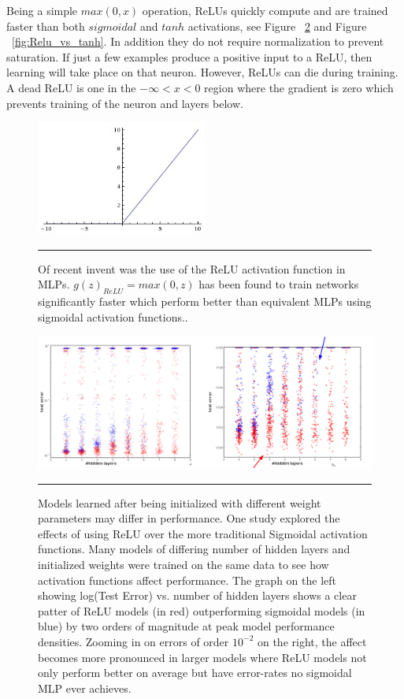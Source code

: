 Being a simple $max(0,x)$ operation, ReLUs quickly compute and are trained faster than both $sigmoidal$ and $tanh$ activations, see Figure ~\ref{fig:Relu_vs_sigmoidal} and Figure ~\ref{fig:Relu_vs_tanh}\citep{krizhevsky2012imagenet}.
In addition they do not require normalization to prevent saturation\citep{krizhevsky2012imagenet}.
If just a few examples produce a positive input to a ReLU, then learning will take place on that neuron.
However, ReLUs can die during training.
A dead ReLU is one in the $-\infty < x < 0$  region where the gradient is zero which prevents training of the neuron and layers below.
\begin{figure}[htbp]
	\centering
		\includegraphics[width = 0.5\textwidth]{./Figures/relu.jpeg}
		\rule{35em}{0.5pt}
	\caption[The ReLU]{Of recent invent\citep{nair2010rectified} was the use of the ReLU activation function in MLPs. $g(z)_{ReLU} = max(0, z)$ has been found to train networks significantly faster which perform better than equivalent MLPs using sigmoidal activation functions..}
	\label{fig:ReLU}
\end{figure}
\begin{figure}[htbp]
	\centering
		\includegraphics[width = 1.0\textwidth]{./Figures/effects_of_hyperpram_on_SGD_Bruel_relu_vs_sigmoidal.jpg}
		\rule{35em}{0.5pt}
	\caption[ReLU vs. Sigmoidal]{Models learned after being initialized with different weight parameters may differ in performance. One study\citep{nair2010rectified} explored the effects of using ReLU over the more traditional Sigmoidal activation functions. Many models of differing number of hidden layers and initialized weights were trained on the same data to see how activation functions affect performance. The graph on the left showing log(Test Error) vs. number of hidden layers shows a clear patter of ReLU models (in red) outperforming sigmoidal models (in blue) by two orders of magnitude at peak model performance densities. Zooming in on errors of order $10^{-2}$ on the right, the affect becomes more pronounced in larger models where ReLU models not only perform better on average but have error-rates no sigmoidal MLP ever achieves. }
	\label{fig:Relu_vs_sigmoidal}
\end{figure}
